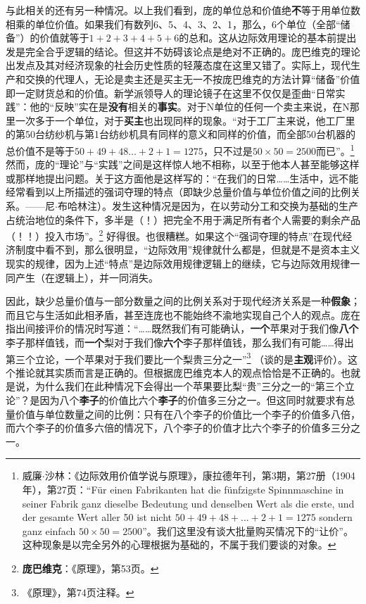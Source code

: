 \documentclass[fontset=fandol, a4paper, 12pt, openright]{ctexbook}
\begin{document}
与此相关的还有另一种情况。以上我们看到，庞的单位总和价值绝\textbf{不}等于用单位数相乘的单位价值。如果我们有数列6、5、4、3、2、1，那么，6个单位（全部“储备”）的价值就等于$1+2+3+4+5+6$的总和。这从边际效用理论的基本前提出发是完全合乎逻辑的结论。但这并不妨碍该论点是绝对不正确的。庞巴维克的理论出发点及其对经济现象的社会历史性质的轻蔑态度在这里又错了。实际上，现代生产和交换的代理人，无论是卖主还是买主无一不按庞巴维克的方法计算“储备”价值即一定财货总和的价值。新学派领导人的理论镜子在这里不仅仅是歪曲“日常实践”：他的“反映”实在是\textbf{没有}相关的\textbf{事实}。对于N单位的任何一个卖主来说，在N那里一次多于一个单位，对于\textbf{买主}也出现同样的现象。“对于工厂主来说，他工厂里的第50台纺纱机与第1台纺纱机具有同样的意义和同样的价值，而全部50台机器的总价值不是等于$50+49+48 \dots +2+1=1275$，只不过是$50 \times 50=2500$而已”。\footnote{威廉$\cdot$沙林：《边际效用价值学说与原理》，康拉德年刊，第3期，第27册（1904年），第27页：“F\"{u}r einen Fabrikanten hat die f\"{u}nfzigste Spinnmaschine in seiner Fabrik ganz dieselbe Bedeutung und denselben Wert als die erste, und der gesamte Wert aller 50 ist nicht $50+49+48+...+2+1=1275$ sondern ganz einfach $50 \times 50=2500$”。我们这里没有谈大批量购买情况下的“让价”。这种现象是以完全另外的心理根据为基础的，不属于我们要谈的对象。} 然而，庞的“理论”与“实践”之间是这样惊人地不相称，以至于他本人甚至能够这样或那样地提出问题。关于这方面他是这样写的：“在我们的日常……生活中，远不能经常看到以上所描述的强词夺理的特点（即缺少总量价值与单位价值之间的比例关系。——尼$\cdot$布哈林注）。发生这种情况是因为，在以劳动分工和交换为基础的生产占统治地位的条件下，多半是（！）把完全不用于满足所有者个人需要的剩余产品（！！）投入市场”。\footnote{\textbf{庞巴维克}：《原理》，第53页。} 好得很。也很糟糕。如果这个“强词夺理的特点”在现代经济制度中看不到，那么很明显，“边际效用”规律就什么都是，但就是不是资本主义现实的规律，因为上述“特点”是边际效用规律逻辑上的继续，它与边际效用规律一同产生（在逻辑上），并一同消失。

因此，缺少总量价值与一部分数量之间的比例关系对于现代经济关系是一种\textbf{假象}；而且它与生活如此相矛盾，甚至连庞也不能始终不渝地实现自己个人的观点。庞在指出间接评价的情况时写道：“……既然我们有可能确认，\textbf{一个}苹果对于我们像\textbf{八个}李子那样值钱，而\textbf{一个}梨对于我们像\textbf{六个}李子那样值钱，那么我们有可能……得出第三个立论，一个苹果对于我们要比一个梨贵三分之一”\footnote{《原理》，第74页注释。} （谈的是\textbf{主观}评价）。这个推论就其实质而言是正确的。但根据庞巴维克本人的观点恰恰是不正确的。也就是说，为什么我们在此种情况下会得出一个苹果要比梨“贵”三分之一的“第三个立论”？是因为八个\textbf{李子}的价值比六个\textbf{李子}的价值多三分之一。但这同时就要求有总量价值与单位数量之间的比例：只有在八个李子的价值比一个李子的价值多八倍，而六个李子的价值多六倍的情况下，八个李子的价值才比六个李子的价值多三分之一。
\end{document}
